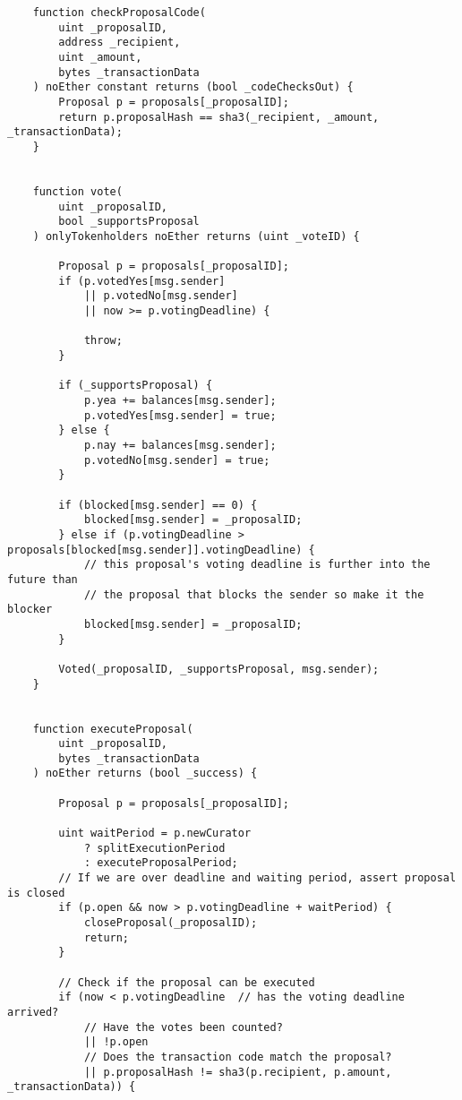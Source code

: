 \documentclass[9pt,oneside]{amsart}
\begin{document}
\begin{appendix}
\begin{verbatim}
    function checkProposalCode(
        uint _proposalID,
        address _recipient,
        uint _amount,
        bytes _transactionData
    ) noEther constant returns (bool _codeChecksOut) {
        Proposal p = proposals[_proposalID];
        return p.proposalHash == sha3(_recipient, _amount, _transactionData);
    }


    function vote(
        uint _proposalID,
        bool _supportsProposal
    ) onlyTokenholders noEther returns (uint _voteID) {

        Proposal p = proposals[_proposalID];
        if (p.votedYes[msg.sender]
            || p.votedNo[msg.sender]
            || now >= p.votingDeadline) {

            throw;
        }

        if (_supportsProposal) {
            p.yea += balances[msg.sender];
            p.votedYes[msg.sender] = true;
        } else {
            p.nay += balances[msg.sender];
            p.votedNo[msg.sender] = true;
        }

        if (blocked[msg.sender] == 0) {
            blocked[msg.sender] = _proposalID;
        } else if (p.votingDeadline > proposals[blocked[msg.sender]].votingDeadline) {
            // this proposal's voting deadline is further into the future than
            // the proposal that blocks the sender so make it the blocker
            blocked[msg.sender] = _proposalID;
        }

        Voted(_proposalID, _supportsProposal, msg.sender);
    }


    function executeProposal(
        uint _proposalID,
        bytes _transactionData
    ) noEther returns (bool _success) {

        Proposal p = proposals[_proposalID];

        uint waitPeriod = p.newCurator
            ? splitExecutionPeriod
            : executeProposalPeriod;
        // If we are over deadline and waiting period, assert proposal is closed
        if (p.open && now > p.votingDeadline + waitPeriod) {
            closeProposal(_proposalID);
            return;
        }

        // Check if the proposal can be executed
        if (now < p.votingDeadline  // has the voting deadline arrived?
            // Have the votes been counted?
            || !p.open
            // Does the transaction code match the proposal?
            || p.proposalHash != sha3(p.recipient, p.amount, _transactionData)) {


\end{verbatim}
\end{appendix}
\end{document}
